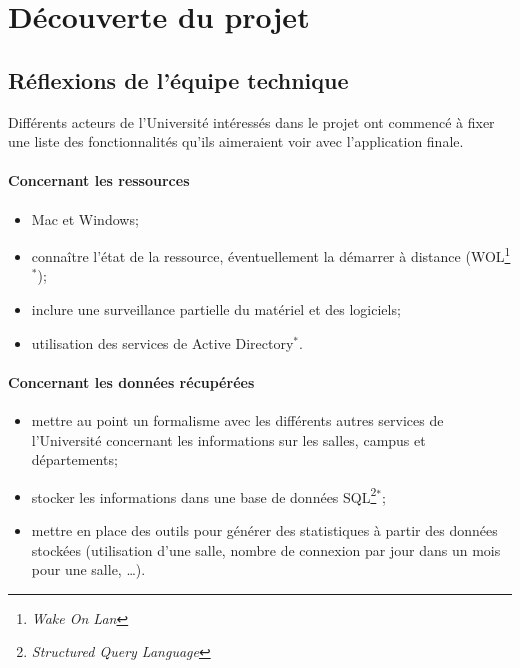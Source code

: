 \chapter{D\'ecouverte du projet}

\section{R\'eflexions de l'\'equipe technique}

Diff\'erents acteurs de l'Universit\'e int\'eress\'es dans le projet \YuukouII{} ont commenc\'e \`a fixer une liste des fonctionnalit\'es qu'ils aimeraient voir avec l'application finale.

\subsubsection{Concernant les ressources}

\begin{itemize}
	\item Mac et Windows;
	\item conna\^itre l'\'etat de la ressource, \'eventuellement la d\'emarrer \`a distance (WOL\protect\footnote{\textit{Wake On Lan}}$^*$);
	\item inclure une surveillance partielle du mat\'eriel et des logiciels;
	\item utilisation des services de Active Directory$^*$.

\end{itemize}

\subsubsection{Concernant les donn\'ees r\'ecup\'er\'ees}

\begin{itemize}
	\item mettre au point un formalisme avec les diff\'erents autres services de l'Universit\'e concernant les informations sur les salles, campus et d\'epartements;
	\item stocker les informations dans une base de donn\'ees SQL\protect\footnote{\textit{Structured Query Language}}$^*$;
	\item mettre en place des outils pour g\'en\'erer des statistiques \`a partir des donn\'ees stock\'ees (utilisation d'une salle, nombre de connexion par jour dans un mois pour une salle, \ldots).

\end{itemize}

